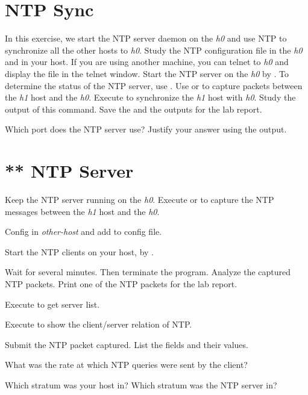 \documentclass{../UTNetLab}
\begin{document}
\section{NTP Sync}
In this exercise, we start the NTP server daemon on the \textit{h0} and use NTP to
synchronize all the other hosts to \textit{h0}.
Study the NTP configuration file  in the \textit{h0} and in your host.
If you are using another machine, you can telnet to \textit{h0} and display the  file in the telnet window.
Start the NTP server on the \textit{h0} by .
To determine the status of the NTP server, use .
Use  or  to capture packets between the \textit{h1} host and the \textit{h0}.
Execute  to synchronize the \textit{h1} host with \textit{h0}.
Study the output of this command.
Save the  and the  outputs for the lab report.

\begin{report}
    \item Which port does the NTP server use?
    Justify your answer using the  output.
\end{report}

\section{** NTP Server}
Keep the NTP server running on the \textit{h0}.
Execute  or  to capture the NTP messages between the \textit{h1} host and the \textit{h0}.

Config  in \textit{other-host} and add  to config file.

Start the NTP clients on your host, by .

Wait for several minutes.
Then terminate the  program.
Analyze the captured NTP packets.
Print one of the NTP packets for the lab report.

Execute  to get  server list.

Execute  to show the client/server relation of NTP.

\begin{report}
    \item Submit the NTP packet captured.
    List the fields and their values.

    \item What was the rate at which NTP queries were sent by the client?

    \item Which stratum was your host in? Which stratum was the NTP server in?
\end{report}
\end{document}
